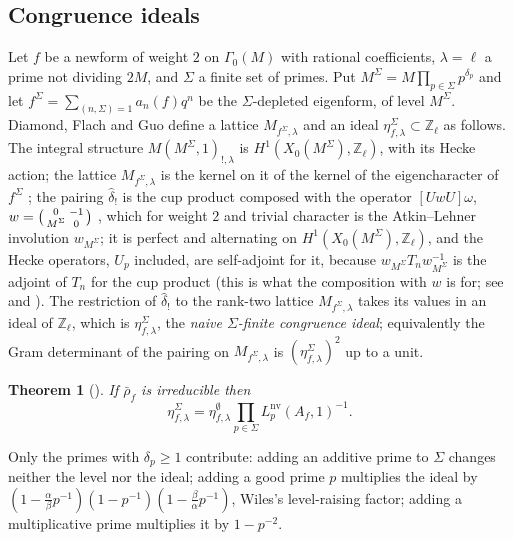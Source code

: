 \documentclass[11pt]{amsart}
\newtheorem{theorem}{Theorem}[section]
\theoremstyle{definition}
\newcommand{\Z}{\mathbb{Z}}
\newcommand{\nv}{\mathrm{nv}}
\begin{document}
\subsection{Congruence ideals}\label{sec:dfg}
Let $f$ be a newform of weight $2$ on $\Gamma_0(M)$ with rational coefficients, $\lambda=\ell$ a prime not dividing $2M$, and $\Sigma$ a finite set of primes. Put $M^\Sigma=M\prod_{p\in\Sigma}p^{\delta_p}$ and let $f^\Sigma=\sum_{(n,\Sigma)=1}a_n(f)q^n$ be the $\Sigma$-depleted eigenform, of level $M^\Sigma$. Diamond, Flach and Guo define \cite[\S\S1.5.3, 1.6.2, 1.7.3]{DFG04} a lattice $M_{f^\Sigma,\lambda}$ and an ideal $\eta^\Sigma_{f,\lambda}\subset\Z_\ell$ as follows. The integral structure $M(M^\Sigma,1)_{!,\lambda}$ is $H^1(X_0(M^\Sigma),\Z_\ell)$, with its Hecke action; the lattice $M_{f^\Sigma,\lambda}$ is the kernel on it of the kernel of the eigencharacter of $f^\Sigma$ \cite[\S1.6.2]{DFG04}; the pairing $\hat\delta_!$ is the cup product composed with the operator $[UwU]\omega$, $w=\begin{psmallmatrix}0&-1\\M^\Sigma&0\end{psmallmatrix}$ \cite[(13), (14)]{DFG04}, which for weight $2$ and trivial character is the Atkin--Lehner involution $w_{M^\Sigma}$; it is perfect and alternating on $H^1(X_0(M^\Sigma),\Z_\ell)$, and the Hecke operators, $U_p$ included, are self-adjoint for it, because $w_{M^\Sigma}T_nw_{M^\Sigma}^{-1}$ is the adjoint of $T_n$ for the cup product (this is what the composition with $w$ is for; see \cite[\S\S1.6.1, 1.8.2]{DFG04} and \cite[\S4.4]{DDT}). The restriction of $\hat\delta_!$ to the rank-two lattice $M_{f^\Sigma,\lambda}$ takes its values in an ideal of $\Z_\ell$, which is $\eta^\Sigma_{f,\lambda}$, the \emph{naive $\Sigma$-finite congruence ideal}; equivalently the Gram determinant of the pairing on $M_{f^\Sigma,\lambda}$ is $(\eta^\Sigma_{f,\lambda})^2$ up to a unit.

\begin{theorem}[{\cite[Proposition 1.4(c)]{DFG04}}]\label{thm:dfg14}
If $\bar\rho_f$ is irreducible then
\[
\eta^\Sigma_{f,\lambda}=\eta^{\emptyset}_{f,\lambda}\prod_{p\in\Sigma}L_p^{\nv}(A_f,1)^{-1}.
\]
\end{theorem}
Only the primes with $\delta_p\ge1$ contribute: adding an additive prime to $\Sigma$ changes neither the level nor the ideal; adding a good prime $p$ multiplies the ideal by $(1-\frac\alpha\beta p^{-1})(1-p^{-1})(1-\frac\beta\alpha p^{-1})$, Wiles's level-raising factor; adding a multiplicative prime multiplies it by $1-p^{-2}$.
\end{document}
